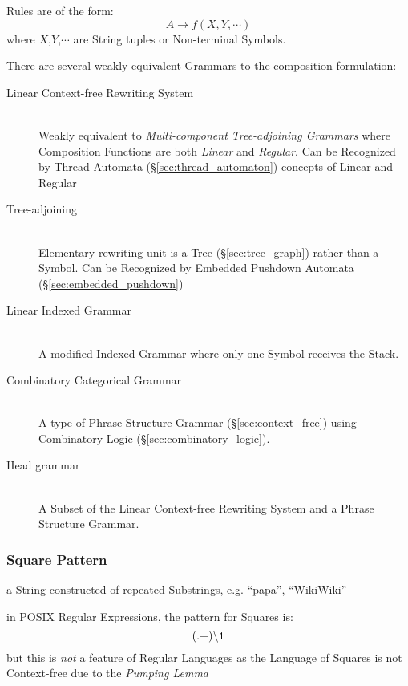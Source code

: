 Rules are of the form:
\[
  A \rightarrow f(X,Y,\cdots)
\]
where $X$,$Y$,$\cdots$ are String tuples or Non-terminal Symbols.

There are several weakly equivalent Grammars to the composition formulation:

\begin{description}
\item[Linear Context-free Rewriting System] \hfill \\
  Weakly equivalent to \emph{Multi-component Tree-adjoining Grammars} where
  Composition Functions are both \emph{Linear} and \emph{Regular}. Can be
  Recognized by Thread Automata
  (\S\ref{sec:thread_automaton})\cite{villemonte02} %
  concepts of Linear and Regular

\item[Tree-adjoining] \hfill \\
  Elementary rewriting unit is a Tree (\S\ref{sec:tree_graph}) rather than a
  Symbol. Can be Recognized by Embedded Pushdown Automata
  (\S\ref{sec:embedded_pushdown})\cite{vijayashanker88}

\item[Linear Indexed Grammar] \hfill \\
  A modified Indexed Grammar where only one Symbol receives the Stack.

\item[Combinatory Categorical Grammar] \hfill \\
  A type of Phrase Structure Grammar (\S\ref{sec:context_free}) using
  Combinatory Logic (\S\ref{sec:combinatory_logic}).

\item[Head grammar] \hfill \\
  A Subset of the Linear Context-free Rewriting System and a Phrase Structure
  Grammar.
\end{description}



\subsubsection{Square Pattern}\label{sec:square_pattern}

a String constructed of repeated Substrings, e.g. ``papa'', ``WikiWiki''

in POSIX Regular Expressions, the pattern for Squares is:
\[
\mathtt{(.+)\backslash1}
\]
but this is \emph{not} a feature of Regular Languages as the Language of Squares
is not Context-free due to the \emph{Pumping Lemma}



